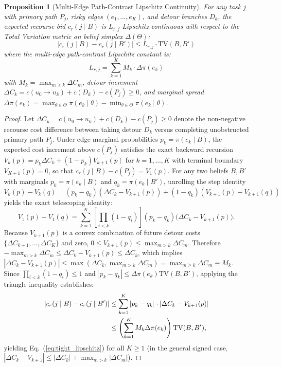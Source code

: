 \documentclass[lettersize,journal]{IEEEtran}
\newtheorem{proposition}{Proposition}
\begin{document}
\begin{proposition}[Multi-Edge Path-Contrast Lipschitz Continuity]
For any task $j$ with primary path $P_j$, risky edges $(e_1, \dots, e_K)$, and detour branches $D_k$, the expected recourse bid $c_r(j \mid B)$ is $L_{r, j}$-Lipschitz continuous with respect to the Total Variation metric on belief simplex $\Delta(\Theta)$:
\begin{equation}
    |c_r(j \mid B) - c_r(j \mid B')| \leq L_{r, j} \cdot \mathrm{TV}(B, B')
\label{eq:tight_lipschitz}
\end{equation}
where the multi-edge path-contrast Lipschitz constant is:
\begin{equation}
    L_{r, j} = \sum_{k=1}^K M_k \cdot \Delta\pi(e_k)
\label{eq:path_contrast_L}
\end{equation}
with $M_k = \max_{m \ge k} \Delta C_m$, detour increment $\Delta C_k = c(u_0 \to u_k) + c(D_k) - c(P_j) \ge 0$, and marginal spread $\Delta\pi(e_k) = \max_{\theta \in \Theta} \pi(e_k \mid \theta) - \min_{\theta \in \Theta} \pi(e_k \mid \theta)$.
\label{prop:tight_lipschitz}
\end{proposition}
\begin{proof}
Let $\Delta C_k = c(u_0 \to u_k) + c(D_k) - c(P_j) \ge 0$ denote the non-negative recourse cost difference between taking detour $D_k$ versus completing unobstructed primary path $P_j$. Under edge marginal probabilities $p_k = \pi(e_k \mid B)$, the expected cost increment above $c(P_j)$ satisfies the exact backward recursion $V_k(p) = p_k \Delta C_k + (1 - p_k) V_{k+1}(p)$ for $k = 1, \dots, K$ with terminal boundary $V_{K+1}(p) = 0$, so that $c_r(j \mid B) - c(P_j) = V_1(p)$. For any two beliefs $B, B'$ with marginals $p_k = \pi(e_k \mid B)$ and $q_k = \pi(e_k \mid B')$, unrolling the step identity $V_k(p) - V_k(q) = (p_k - q_k)(\Delta C_k - V_{k+1}(p)) + (1 - q_k)(V_{k+1}(p) - V_{k+1}(q))$ yields the exact telescoping identity:
\begin{equation}
    V_1(p) - V_1(q) = \sum_{k=1}^K \left[ \prod_{i < k} (1 - q_i) \right] (p_k - q_k) \big( \Delta C_k - V_{k+1}(p) \big).
\end{equation}
Because $V_{k+1}(p)$ is a convex combination of future detour costs $\{\Delta C_{k+1}, \dots, \Delta C_K\}$ and zero, $0 \le V_{k+1}(p) \le \max_{m > k} \Delta C_m$. Therefore $-\max_{m > k} \Delta C_m \le \Delta C_k - V_{k+1}(p) \le \Delta C_k$, which implies $|\Delta C_k - V_{k+1}(p)| \le \max(\Delta C_k, \max_{m > k} \Delta C_m) = \max_{m \ge k} \Delta C_m \equiv M_k$. Since $\prod_{i<k}(1 - q_i) \le 1$ and $|p_k - q_k| \le \Delta\pi(e_k) \mathrm{TV}(B, B')$, applying the triangle inequality establishes:
\begin{align}
    |c_r(j \mid B) - c_r(j \mid B')| &\le \sum_{k=1}^K |p_k - q_k| \cdot |\Delta C_k - V_{k+1}(p)| \notag \\
    &\le \left( \sum_{k=1}^K M_k \Delta\pi(e_k) \right) \mathrm{TV}(B, B'),
\end{align}
yielding Eq.~(\ref{eq:tight_lipschitz}) for all $K \ge 1$ (in the general signed case, $|\Delta C_k - V_{k+1}| \le |\Delta C_k| + \max_{m>k}|\Delta C_m|$).
\end{proof}
\end{document}
